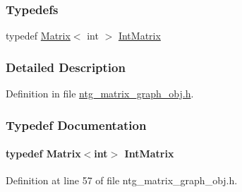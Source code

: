 \subsubsection*{Typedefs}
\begin{DoxyCompactItemize}
\item 
typedef \hyperlink{class_t_n_t_1_1_matrix}{Matrix}$<$ int $>$ \hyperlink{ntg__matrix__graph__obj_8h_acf77a0d53e3d823815fa8796b00f7454}{IntMatrix}
\end{DoxyCompactItemize}


\subsubsection{Detailed Description}


Definition in file \hyperlink{ntg__matrix__graph__obj_8h_source}{ntg\_\-matrix\_\-graph\_\-obj.h}.



\subsubsection{Typedef Documentation}
\paragraph[{IntMatrix}]{\setlength{\rightskip}{0pt plus 5cm}typedef {\bf Matrix}$<$int$>$ {\bf IntMatrix}}\hfill\label{ntg__matrix__graph__obj_8h_acf77a0d53e3d823815fa8796b00f7454}


Definition at line 57 of file ntg\_\-matrix\_\-graph\_\-obj.h.


